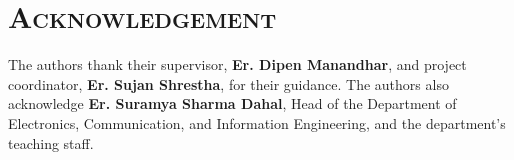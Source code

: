\chapter*{\scshape Acknowledgement}	

The authors thank their supervisor, \textbf{Er. Dipen Manandhar}, and project coordinator, \textbf{Er. Sujan Shrestha}, for their guidance. The authors also acknowledge \textbf{Er. Suramya Sharma Dahal}, Head of the Department of Electronics, Communication, and Information Engineering, and the department's teaching staff.

	\vfill %
	
